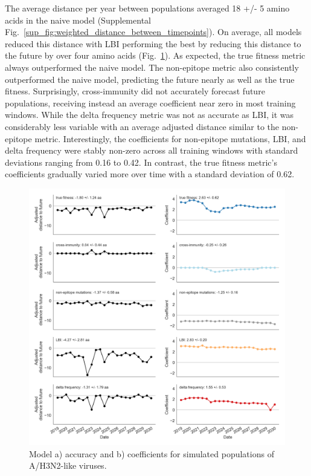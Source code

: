 The average distance per year between populations averaged 18 +/- 5 amino acids in the naive model (Supplemental Fig.~\ref{sup_fig:weighted_distance_between_timepoints}).
On average, all models reduced this distance with LBI performing the best by reducing this distance to the future by over four amino acids (Fig.~\ref{fig:model_accuracy_and_coefficients_for_simulated_populations}).
As expected, the true fitness metric always outperformed the naive model.
The non-epitope metric also consistently outperformed the naive model, predicting the future nearly as well as the true fitness.
Surprisingly, cross-immunity did not accurately forecast future populations, receiving instead an average coefficient near zero in most training windows.
While the delta frequency metric was not as accurate as LBI, it was considerably less variable with an average adjusted distance similar to the non-epitope metric.
Interestingly, the coefficients for non-epitope mutations, LBI, and delta frequency were stably non-zero across all training windows with standard deviations ranging from 0.16 to 0.42.
In contrast, the true fitness metric's coefficients gradually varied more over time with a standard deviation of 0.62.

\begin{figure}[t]
  \begin{center}
  \includegraphics[width=\textwidth]{figures/model-accuracy-and-coefficients-for-simulated-populations.png}
  \caption{Model a) accuracy and b) coefficients for simulated populations of A/H3N2-like viruses.}
  \label{fig:model_accuracy_and_coefficients_for_simulated_populations}
  \end{center}
\end{figure}

